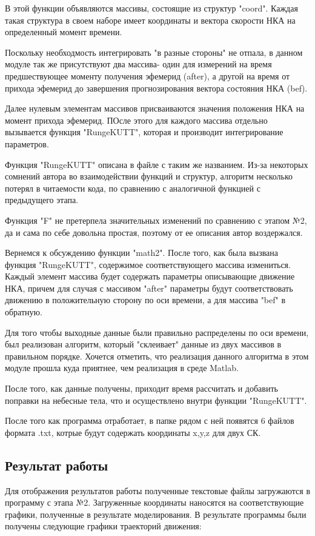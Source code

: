 \documentclass[]{article}
\begin{document}
В этой функции объявляются массивы, состоящие из структур "coord". Каждая такая структура в своем наборе имеет координаты и вектора скорости НКА на определенный момент времени.

Поскольку необходмость интегрировать "в разные стороны" не отпала, в данном модуле так же присутствуют два массива- один для измерений на время предшествующее моменту получения эфемерид (after), а другой на время от прихода эфемерид до завершения прогнозирования вектора состояния НКА (bef).

Далее нулевым элементам массивов присваиваются значения положения НКА на момент прихода эфемерид. ПОсле этого для каждого массива отдельно вызывается функция "RungeKUTT", которая и производит интегрирование параметров.

Функция "RungeKUTT" описана в файле с таким же названием. 
Из-за некоторых сомнений автора во взаимодействии функций и структур, алгоритм несколько потерял в читаемости кода, по сравнению с аналогичной функцией с предыдущего этапа.

Функция "F" не претерпела значительных изменений по сравнению с этапом №2, да и сама по себе довольна простая, поэтому от ее описания автор воздержался.

Вернемся к обсуждению функции "math2". После того, как была вызвана функция "RungeKUTT", содержимое соответствующего массива измениться. Каждый элемент массива будет содержать параметры описывающие движение НКА, причем для случая с массивом "after" параметры будут соответствовать движению в положительную сторону по оси времени, а для массива "bef" в обратную.

Для того чтобы выходные данные были правильно распределены по оси времени, был реализован алгоритм, который "склеивает" данные из двух массивов в правильном порядке. Хочется отметить, что реализация данного алгоритма в этом модуле прошла куда приятнее, чем реализация в среде Matlab.

После того, как данные получены, приходит время рассчитать и добавить поправки на небесные тела, что и осуществлено внутри функции "RungeKUTT".

После того как программа отработает, в папке рядом с ней появятся 6 файлов формата .txt, котрые будут содержать координаты x,y,z для двух СК.




\subsection{Результат работы}
Для отображения результатов работы полученные текстовые файлы загружаются в программу с этапа №2. Загруженные координаты наносятся на соответствующие графики, полученные в результате моделирования.
В результате программы были получены следующие графики траекторий движения:
\end{document}
